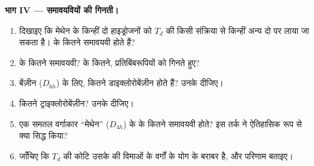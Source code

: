 \begin{problem}
\medskip\noindent\textbf{भाग IV --- समावयवियों की गिनती।}
\begin{enumerate}[resume]
  \item दिखाइए कि मेथेन के किन्हीं दो हाइड्रोजनों को $T_d$ की किसी संक्रिया से किन्हीं अन्य
        दो पर लाया जा सकता है।  के कितने समावयवी होते हैं?
  \item {} के कितने समावयवी?  के कितने, प्रतिबिंबरूपियों को गिनते हुए?
  \item बेंज़ीन ($D_{6h}$) के लिए, कितने डाइक्लोरोबेंज़ीन होते हैं? उनके
         दीजिए।
  \item कितने ट्राइक्लोरोबेंज़ीन? उनके  दीजिए।
  \item एक समतल वर्गाकार ``मेथेन'' ($D_{4h}$) के  के कितने समावयवी
        होते? इस तर्क ने ऐतिहासिक रूप से क्या सिद्ध किया?
  \item जाँचिए कि $T_d$ की कोटि उसके  की विमाओं के वर्गों
        के योग के बराबर है, और परिणाम बताइए।
\end{enumerate}
\end{problem}
